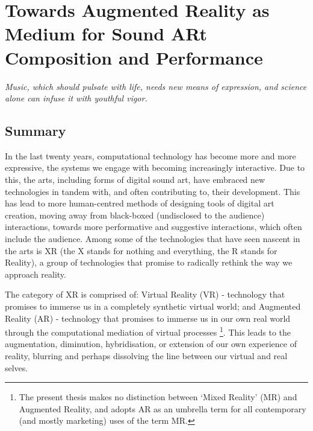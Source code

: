 \chapter{Towards Augmented Reality as Medium for Sound ARt Composition and Performance}
\label{sec: introduction}
\epigraph{\emph{Music, which should pulsate with life, needs new means of expression, and science alone can infuse it with youthful vigor.}}{\citep{varese1966}}
\clearpage
\section{Summary}\label{sec: introduction-summary}
In the last twenty years, computational technology has become more and more expressive, the systems we engage with becoming increasingly interactive. Due to this, the arts, including forms of digital sound art, have embraced new technologies in tandem with, and often contributing to, their development. This has lead to more human-centred methods of designing tools of digital art creation, moving away from black-boxed (undisclosed to the audience) interactions, towards more performative and suggestive interactions, which often include the audience. Among some of the technologies that have seen nascent in the arts is XR (the X stands for nothing and everything, the R stands for Reality), a group of technologies that promise to radically rethink the way we approach reality. 

The category of XR is comprised of: Virtual Reality (VR) - technology that promises to immerse us in a completely synthetic virtual world; and Augmented Reality (AR) -  technology that promises to immerse us in our own real world through the computational mediation of virtual processes \footnote{The present thesis makes no distinction between `Mixed Reality' (MR) and Augmented Reality, and adopts AR as an umbrella term for all contemporary (and mostly marketing) uses of the term MR.}. This leads to the augmentation, diminution, hybridisation, or extension of our own experience of reality, blurring and perhaps dissolving the line between our virtual and real selves.

